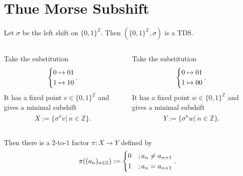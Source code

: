 \section{Thue Morse Subshift}

\begin{frame}
	Let $\sigma$ be the left shift on $\{0, 1\}^\mathbb{Z}$. Then $(\{0, 1\}^\mathbb{Z}, \sigma)$ is a TDS.\pause
	\begin{columns}
		\begin{column}{.5\textwidth}
			\begin{example}
				Take the substitution
				\begin{align*}
					\begin{dcases}
						0 \mapsto 01\\
						1 \mapsto 10
					\end{dcases}.
				\end{align*}\pause
				It has a fixed point $v \in \{0, 1\}^\mathbb{Z}$ and gives a minimal subshift
				\begin{align*}
					X := \overline{\{\sigma^nv|\ n \in \mathbb{Z}\}}.
				\end{align*}
			\end{example}\pause
		\end{column}
		\begin{column}{.5\textwidth}
			\begin{example}
				Take the substitution
				\begin{align*}
					\begin{dcases}
						0 \mapsto 01\\
						1 \mapsto 00
					\end{dcases}.
				\end{align*}\pause
				It has a fixed point $w \in \{0, 1\}^\mathbb{Z}$ and gives a minimal subshift
				\begin{align*}
					Y := \overline{\{\sigma^nw|\ n \in \mathbb{Z}\}}.
				\end{align*}
			\end{example}\pause
		\end{column}
	\end{columns}
	\medskip

	Then there is a $2$-to-$1$ factor $\pi: X \to Y$ defined by
	\begin{align*}
		\pi((a_n)_{n \in \mathbb{Z}}) :=
		\begin{dcases}
			0 &; a_n \neq a_{n+1}\\
			1 &; a_n = a_{n+1}
		\end{dcases}.
	\end{align*} 
\end{frame}

